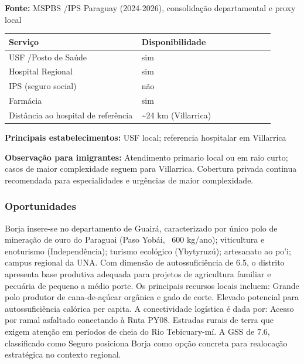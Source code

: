 \textbf{Fonte:} MSPBS /\allowbreak  IPS Paraguay (2024-2026), consolidação
departamental e proxy local

{\def\LTcaptype{none} %
\begin{longtable}{@{}>{\raggedright\arraybackslash}p{0.45\linewidth} >{\raggedright\arraybackslash}p{0.45\linewidth}@{}}
\toprule\noalign{}
Serviço & Disponibilidade \\
\midrule\noalign{}
\endhead
\bottomrule\noalign{}
\endlastfoot
USF /\allowbreak  Posto de Saúde & sim \\
Hospital Regional & sim \\
IPS (seguro social) & não \\
Farmácia & sim \\
Distância ao hospital de referência & \textasciitilde24 km
(Villarrica) \\
\end{longtable}
}

\textbf{Principais estabelecimentos:} USF local; referencia hospitalar
em Villarrica

\textbf{Observação para imigrantes:} Atendimento primario local ou em
raio curto; casos de maior complexidade seguem para Villarrica.
Cobertura privada continua recomendada para especialidades e urgências
de maior complexidade.
\newpage

\subsubsection*{Oportunidades}\label{oport-borja-0402}
Borja insere-se no departamento de Guairá, caracterizado por único polo de mineração de ouro do Paraguai (Paso Yobái, ~600 kg/ano); viticultura e enoturismo (Independência); turismo ecológico (Ybytyruzú); artesanato ao po'i; campus regional da UNA. Com dimensão de autossuficiência de 6.5, o distrito apresenta base produtiva adequada para projetos de agricultura familiar e pecuária de pequeno a médio porte. Os principais recursos locais incluem: Grande polo produtor de cana-de-açúcar orgânica e gado de corte. Elevado potencial para autossuficiência calórica per capita. A conectividade logística é dada por: Acesso por ramal asfaltado conectando à Ruta PY08. Estradas rurais de terra que exigem atenção em períodos de cheia do Rio Tebicuary-mí. A GSS de 7.6, classificado como Seguro posiciona Borja como opção concreta para realocação estratégica no contexto regional.

